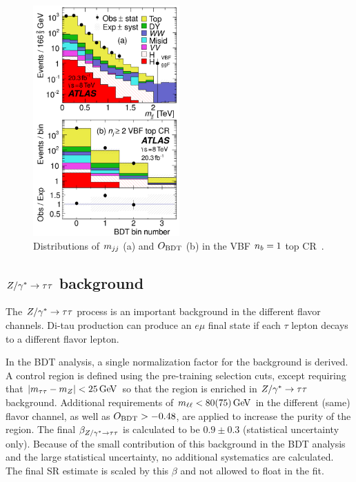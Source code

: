 \begin{figure}[h!]
  \centering
  \captionsetup{justification=centering}
  \includegraphics[width=0.5\textwidth]{figures/VBF_topcr}
  \caption{Distributions of $m_{jj}$ (a) and $O_{\rm BDT}$ (b) in the VBF $n_b = 1$ top CR~\cite{WW2015}.}
  \label{fig:vbf_top_cr}
\end{figure}

\subsection{$Z/\gamma^{\ast} \to \tau\tau$ background}

The $Z/\gamma^{\ast} \to \tau\tau$ process is an important background in the different flavor channels. Di-tau production can produce an $e\mu$ final state if each $\tau$ lepton decays to a different flavor lepton. 

In the BDT analysis, a single normalization factor for the background is derived. A control region is defined using the pre-training selection cuts, except requiring that $|\mtt - m_Z| < 25 \GeV$ so that the region is enriched in $Z/\gamma^{\ast} \to \tau\tau$ background. Additional requirements of $\mll < 80 (75) \GeV$ in the different (same) flavor channel, as well as $O_{\rm BDT} > -0.48$, are applied to increase the purity of the region. The final $\beta_{Z/\gamma^{\ast} \to \tau\tau}$ is calculated to be $0.9 \pm 0.3$ (statistical uncertainty only). Because of the small contribution of this background in the BDT analysis and the large statistical uncertainty, no additional systematics are calculated. The final SR estimate is scaled by this $\beta$ and not allowed to float in the fit. 

